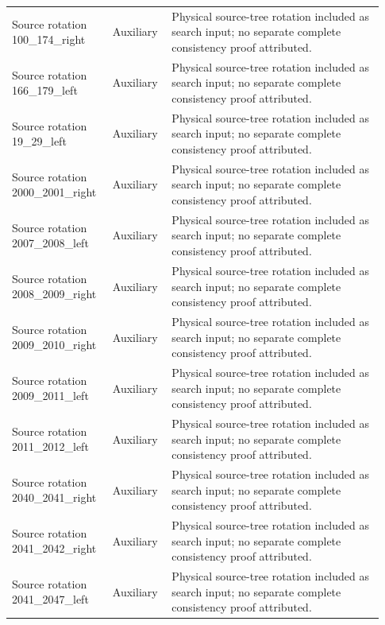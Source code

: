 \begin{longtable}{@{}p{0.25\linewidth}p{0.14\linewidth}p{0.54\linewidth}@{}}
Source rotation 100\_\allowbreak{}174\_\allowbreak{}right & Auxiliary & Physical source-tree rotation included as search input; no separate complete consistency proof attributed. \\
Source rotation 166\_\allowbreak{}179\_\allowbreak{}left & Auxiliary & Physical source-tree rotation included as search input; no separate complete consistency proof attributed. \\
Source rotation 19\_\allowbreak{}29\_\allowbreak{}left & Auxiliary & Physical source-tree rotation included as search input; no separate complete consistency proof attributed. \\
Source rotation 2000\_\allowbreak{}2001\_\allowbreak{}right & Auxiliary & Physical source-tree rotation included as search input; no separate complete consistency proof attributed. \\
Source rotation 2007\_\allowbreak{}2008\_\allowbreak{}left & Auxiliary & Physical source-tree rotation included as search input; no separate complete consistency proof attributed. \\
Source rotation 2008\_\allowbreak{}2009\_\allowbreak{}right & Auxiliary & Physical source-tree rotation included as search input; no separate complete consistency proof attributed. \\
Source rotation 2009\_\allowbreak{}2010\_\allowbreak{}right & Auxiliary & Physical source-tree rotation included as search input; no separate complete consistency proof attributed. \\
Source rotation 2009\_\allowbreak{}2011\_\allowbreak{}left & Auxiliary & Physical source-tree rotation included as search input; no separate complete consistency proof attributed. \\
Source rotation 2011\_\allowbreak{}2012\_\allowbreak{}left & Auxiliary & Physical source-tree rotation included as search input; no separate complete consistency proof attributed. \\
Source rotation 2040\_\allowbreak{}2041\_\allowbreak{}right & Auxiliary & Physical source-tree rotation included as search input; no separate complete consistency proof attributed. \\
Source rotation 2041\_\allowbreak{}2042\_\allowbreak{}right & Auxiliary & Physical source-tree rotation included as search input; no separate complete consistency proof attributed. \\
Source rotation 2041\_\allowbreak{}2047\_\allowbreak{}left & Auxiliary & Physical source-tree rotation included as search input; no separate complete consistency proof attributed. \\

\end{longtable}
